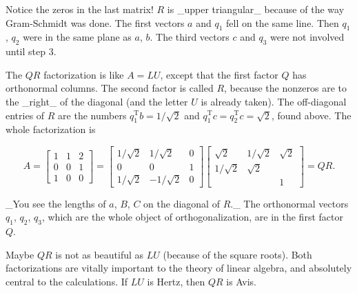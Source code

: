 Notice the zeros in the last matrix! \(R\) is _upper triangular_ because of the way Gram-Schmidt was done. The first vectors \(a\) and \(q_{1}\) fell on the same line. Then \(q_{1}\), \(q_{2}\) were in the same plane as \(a\), \(b\). The third vectors \(c\) and \(q_{3}\) were not involved until step 3.

The \(QR\) factorization is like \(A=LU\), except that the first factor \(Q\) has orthonormal columns. The second factor is called \(R\), because the nonzeros are to the _right_ of the diagonal (and the letter \(U\) is already taken). The off-diagonal entries of \(R\) are the numbers \(q_{1}^{\mathrm{T}}b=1/\sqrt{2}\) and \(q_{1}^{\mathrm{T}}c=q_{2}^{\mathrm{T}}c=\sqrt{2}\), found above. The whole factorization is

\[A=\begin{bmatrix}1&1&2\\ 0&0&1\\ 1&0&0\end{bmatrix}=\begin{bmatrix}1/\sqrt{2}&1/\sqrt{2}&0\\ 0&0&1\\ 1/\sqrt{2}&-1/\sqrt{2}&0\end{bmatrix}\begin{bmatrix}\sqrt{2}&1/\sqrt{2}& \sqrt{2}\\ 1/\sqrt{2}&\sqrt{2}\\ &&1\end{bmatrix}=QR.\]

_You see the lengths of \(a\), \(B\), \(C\) on the diagonal of \(R\)._ The orthonormal vectors \(q_{1}\), \(q_{2}\), \(q_{3}\), which are the whole object of orthogonalization, are in the first factor \(Q\).

Maybe \(QR\) is not as beautiful as \(LU\) (because of the square roots). Both factorizations are vitally important to the theory of linear algebra, and absolutely central to the calculations. If \(LU\) is Hertz, then \(QR\) is Avis.

 